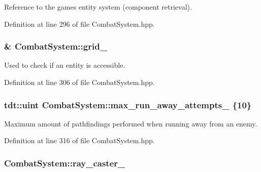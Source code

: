 Reference to the game\textquotesingle{}s entity system (component retrieval). 



Definition at line 296 of file Combat\+System.\+hpp.

\subsubsection[{\texorpdfstring{grid\+\_\+}{grid_}}]{\& Combat\+System\+::grid\+\_\+\hspace{0.3cm}{\ttfamily [private]}}\hypertarget{class_combat_system_a90e8e6bb234cb358f676101f8da2daaf}{}\label{class_combat_system_a90e8e6bb234cb358f676101f8da2daaf}


Used to check if an entity is accessible. 



Definition at line 306 of file Combat\+System.\+hpp.

\subsubsection[{\texorpdfstring{max\+\_\+run\+\_\+away\+\_\+attempts\+\_\+}{max_run_away_attempts_}}]{\setlength{\rightskip}{0pt plus 5cm}tdt\+::uint Combat\+System\+::max\+\_\+run\+\_\+away\+\_\+attempts\+\_\+ \{10\}\hspace{0.3cm}{\ttfamily [private]}}\hypertarget{class_combat_system_a1b68f04d3aee2673466cc57701d8e2e1}{}\label{class_combat_system_a1b68f04d3aee2673466cc57701d8e2e1}


Maximum amount of pathfindings performed when running away from an enemy. 



Definition at line 316 of file Combat\+System.\+hpp.

\subsubsection[{\texorpdfstring{ray\+\_\+caster\+\_\+}{ray_caster_}}]{ Combat\+System\+::ray\+\_\+caster\+\_\+\hspace{0.3cm}{\ttfamily [private]}}\hypertarget{class_combat_system_aefac99884a4c7fa895f09dd484a3bd15}{}\label{class_combat_system_aefac99884a4c7fa895f09dd484a3bd15}


